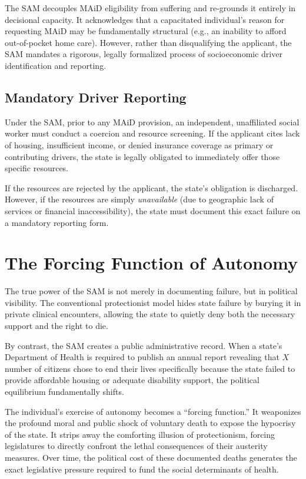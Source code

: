 \documentclass[10pt, twocolumn, letterpaper]{article}
\begin{document}
The SAM decouples MAiD eligibility from suffering and re-grounds it entirely in decisional capacity. It acknowledges that a capacitated individual's reason for requesting MAiD may be fundamentally structural (e.g., an inability to afford out-of-pocket home care). However, rather than disqualifying the applicant, the SAM mandates a rigorous, legally formalized process of socioeconomic driver identification and reporting.

\subsection{Mandatory Driver Reporting}

Under the SAM, prior to any MAiD provision, an independent, unaffiliated social worker must conduct a coercion and resource screening. If the applicant cites lack of housing, insufficient income, or denied insurance coverage as primary or contributing drivers, the state is legally obligated to immediately offer those specific resources.

If the resources are rejected by the applicant, the state's obligation is discharged. However, if the resources are simply \textit{unavailable} (due to geographic lack of services or financial inaccessibility), the state must document this exact failure on a mandatory reporting form.

\section{The Forcing Function of Autonomy}

The true power of the SAM is not merely in documenting failure, but in political visibility. The conventional protectionist model hides state failure by burying it in private clinical encounters, allowing the state to quietly deny both the necessary support and the right to die.

By contrast, the SAM creates a public administrative record. When a state's Department of Health is required to publish an annual report revealing that $X$ number of citizens chose to end their lives specifically because the state failed to provide affordable housing or adequate disability support, the political equilibrium fundamentally shifts.

The individual's exercise of autonomy becomes a ``forcing function.'' It weaponizes the profound moral and public shock of voluntary death to expose the hypocrisy of the state. It strips away the comforting illusion of protectionism, forcing legislatures to directly confront the lethal consequences of their austerity measures. Over time, the political cost of these documented deaths generates the exact legislative pressure required to fund the social determinants of health. 
\end{document}
